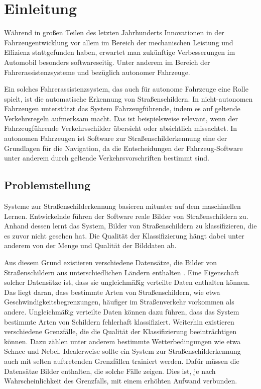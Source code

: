 \chapter{Einleitung}
Während in großen Teilen des letzten Jahrhunderts Innovationen in der Fahrzeugentwicklung vor allem im Bereich der mechanischen Leistung und Effizienz stattgefunden haben, erwartet man zukünftige Verbesserungen im Automobil besonders softwareseitig. Unter anderem im Bereich der Fahrerassistenzsysteme und bezüglich autonomer Fahrzeuge. \cite{Staron2021}

Ein solches Fahrerassistenzsystem, das auch für autonome Fahrzeuge eine Rolle spielt, ist die automatische Erkennung von Straßenschildern. In nicht-autonomen Fahrzeugen unterstützt das System Fahrzeugführende, indem es auf geltende Verkehrsregeln aufmerksam macht. Das ist beispielsweise relevant, wenn der Fahrzeugführende Verkehrsschilder übersieht oder absichtlich missachtet. In autonomen Fahrzeugen ist Software zur Straßenschilderkennung eine der Grundlagen für die Navigation, da die Entscheidungen der Fahrzeug-Software unter anderem durch geltende Verkehrsvorschriften bestimmt sind. \cite{traffic-sign-detection-review-2014}

\section{Problemstellung}

Systeme zur Straßenschilderkennung basieren mitunter auf dem maschinellen Lernen. Entwickelnde führen der Software reale Bilder von Straßenschildern zu. Anhand dessen lernt das System, Bilder von Straßenschildern zu klassifizieren, die es zuvor nicht gesehen hat. Die Qualität der Klassifizierung hängt dabei unter anderem von der Menge und Qualität der Bilddaten ab. \cite{traffic-sign-detection-review-2014}

Aus diesem Grund existieren verschiedene Datensätze, die Bilder von Straßenschildern aus unterschiedlichen Ländern enthalten \cite{GTSRB}. Eine Eigenschaft solcher Datensätze ist, dass sie ungleichmäßig verteilte Daten enthalten können. Das liegt daran, dass bestimmte Arten von Straßenschildern, wie etwa Geschwindigkeitsbegrenzungen, häufiger im Straßenverkehr vorkommen als andere. Ungleichmäßig verteilte Daten können dazu führen, dass das System bestimmte Arten von Schildern fehlerhaft klassifiziert. Weiterhin existieren verschiedene Grenzfälle, die die Qualität der Klassifizierung beeinträchtigen können. Dazu zählen unter anderem bestimmte Wetterbedingungen wie etwa Schnee und Nebel. Idealerweise sollte ein System zur Straßenschilderkennung auch mit selten auftretenden Grenzfällen trainiert werden. Dafür müssen die Datensätze Bilder enthalten, die solche Fälle zeigen. Dies ist, je nach Wahrscheinlichkeit des Grenzfalls, mit einem erhöhten Aufwand verbunden.

